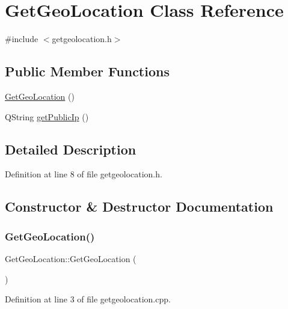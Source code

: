 \hypertarget{classGetGeoLocation}{}\section{Get\+Geo\+Location Class Reference}
\label{classGetGeoLocation}


{\ttfamily \#include $<$getgeolocation.\+h$>$}

\subsection*{Public Member Functions}
\begin{DoxyCompactItemize}
\item 
\hyperlink{classGetGeoLocation_a0ddbdc5181b59f4d8c8f2d3ec496dc4e}{Get\+Geo\+Location} ()
\item 
Q\+String \hyperlink{classGetGeoLocation_a2ea05cee775ed59dc9b0149f30a8b1f8}{get\+Public\+Ip} ()
\end{DoxyCompactItemize}


\subsection{Detailed Description}


Definition at line 8 of file getgeolocation.\+h.



\subsection{Constructor \& Destructor Documentation}
\mbox{\label{classGetGeoLocation_a0ddbdc5181b59f4d8c8f2d3ec496dc4e}} 
\subsubsection{\texorpdfstring{Get\+Geo\+Location()}{GetGeoLocation()}}
{\footnotesize\ttfamily Get\+Geo\+Location\+::\+Get\+Geo\+Location (\begin{DoxyParamCaption}{ }\end{DoxyParamCaption})}



Definition at line 3 of file getgeolocation.\+cpp.



